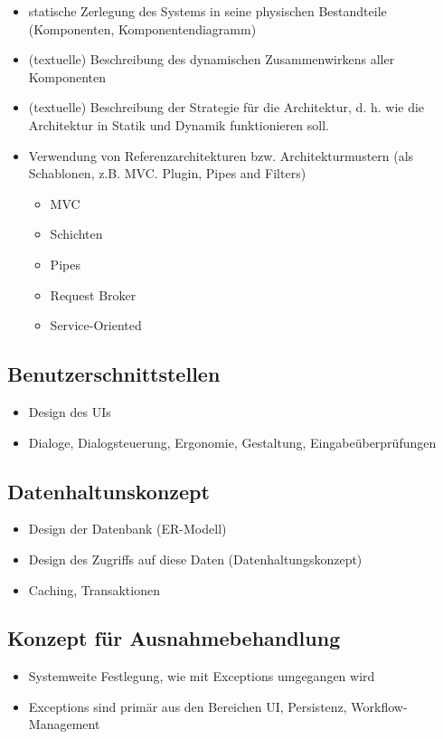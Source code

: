 \begin{itemize}
	\item  statische Zerlegung des Systems in seine physischen Bestandteile (Komponenten, Komponentendiagramm)
	\item (textuelle) Beschreibung des dynamischen Zusammenwirkens aller Komponenten
	\item (textuelle) Beschreibung der Strategie für die Architektur, d. h. wie die Architektur in Statik und Dynamik funktionieren soll.
	\item Verwendung von Referenzarchitekturen bzw. Architekturmustern (als Schablonen, z.B. MVC. Plugin, Pipes and Filters)
	      \begin{itemize}
		      \item MVC
		      \item Schichten
		      \item Pipes
		      \item Request Broker
		      \item Service-Oriented
	      \end{itemize}
\end{itemize}

\subsection{Benutzerschnittstellen}
\begin{itemize}
	\item Design des UIs
	\item Dialoge, Dialogsteuerung, Ergonomie, Gestaltung, Eingabeüberprüfungen
\end{itemize}

\subsection{Datenhaltunskonzept}
\begin{itemize}
	\item Design der Datenbank (ER-Modell)
	\item Design des Zugriffs auf diese Daten (Datenhaltungskonzept)
	\item Caching, Transaktionen
\end{itemize}

\subsection{Konzept für Ausnahmebehandlung}
\begin{itemize}
	\item Systemweite Festlegung, wie mit Exceptions umgegangen wird
	\item Exceptions sind primär aus den Bereichen UI, Persistenz, Workflow-Management
\end{itemize}

